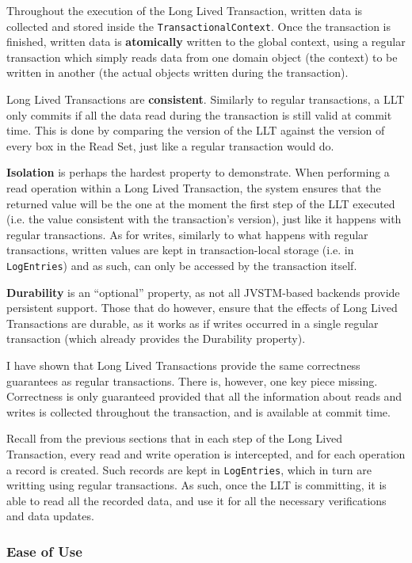\documentclass{llncs}
\begin{document}
Throughout the execution of the Long Lived Transaction, written data
is collected and stored inside the \texttt{TransactionalContext}. Once
the transaction is finished, written data is {\bf atomically} written
to the global context, using a regular transaction which simply reads
data from one domain object (the context) to be written in another
(the actual objects written during the transaction).

Long Lived Transactions are {\bf consistent}. Similarly to regular
transactions, a LLT only commits if all the data read during the
transaction is still valid at commit time. This is done by comparing
the version of the LLT against the version of every box in the Read
Set, just like a regular transaction would do.

{\bf Isolation} is perhaps the hardest property to demonstrate. When
performing a read operation within a Long Lived Transaction, the
system ensures that the returned value will be the one at the moment
the first step of the LLT executed (i.e. the value consistent with the
transaction's version), just like it happens with regular
transactions.  As for writes, similarly to what happens with regular
transactions, written values are kept in transaction-local storage
(i.e. in \texttt{LogEntries}) and as such, can only be accessed by the
transaction itself.

{\bf Durability} is an ``optional'' property, as not all JVSTM-based
backends provide persistent support. Those that do however, ensure
that the effects of Long Lived Transactions are durable, as it works as
if writes occurred in a single regular transaction (which already
provides the Durability property).

I have shown that Long Lived Transactions provide the same correctness
guarantees as regular transactions. There is, however, one key piece
missing. Correctness is only guaranteed provided that all the
information about reads and writes is collected throughout the
transaction, and is available at commit time.

Recall from the previous sections that in each step of the Long Lived
Transaction, every read and write operation is intercepted, and for
each operation a record is created. Such records are kept in
\texttt{LogEntries}, which in turn are writting using regular
transactions. As such, once the LLT is committing, it is able to read
all the recorded data, and use it for all the necessary verifications
and data updates.

\subsubsection{Ease of Use}
\end{document}
